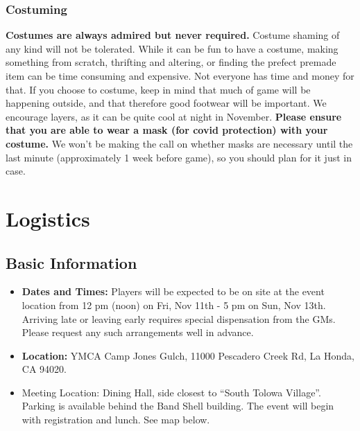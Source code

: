 \documentclass[sheet]{GL2020}
\begin{document}
\subsubsection{Costuming} 
\textbf{Costumes are always admired but never required.} Costume shaming of any kind will not be tolerated. While it can be fun to have a costume, making something from scratch, thrifting and altering, or finding the prefect premade item can be time consuming and expensive. Not everyone has time and money for that. If you choose to costume, keep in mind that much of game will be happening outside, and that therefore good footwear will be important. We encourage layers, as it can be quite cool at night in November. \textbf{Please ensure that you are able to wear a mask (for covid protection) with your costume.} We won’t be making the call on whether masks are necessary until the last minute (approximately 1 week before game), so you should plan for it just in case.


\section{Logistics}
\subsection{Basic Information}
\begin{itemize}
  \item \textbf{Dates and Times:} Players will be expected to be on site at the event location from 12 pm (noon) on Fri, Nov 11th - 5 pm on Sun, Nov 13th. Arriving late or leaving early requires special dispensation from the GMs. Please request any such arrangements well in advance.
  \item \textbf{Location:} YMCA Camp Jones Gulch, 11000 Pescadero Creek Rd, La Honda, CA 94020.
  \item Meeting Location: Dining Hall, side closest to ``South Tolowa Village''. Parking is available behind the Band Shell building. The event will begin with registration and lunch. See map below.
\end{itemize}
\end{document}
